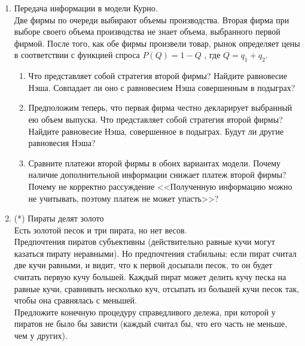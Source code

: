 \documentclass[pdftex,12pt,a4paper]{article}
\begin{document}
\begin{enumerate}
\item Передача информации в модели Курно.\\
Две фирмы по очереди выбирают объемы производства. Вторая фирма при выборе своего объема производства не знает объема, выбранного первой фирмой. После того, как обе фирмы произвели товар, рынок определяет цены в соответствии с функцией спроса $P\left( Q \right) = 1 - Q$
, где $Q = q_1  + q_2 $.
\begin{enumerate}
\item Что представляет собой стратегия второй фирмы? Найдите равновесие Нэша. Совпадает ли оно с равновесием Нэша совершенным в подыграх?
\item Предположим теперь, что первая фирма честно декларирует выбранный ею объем выпуска. Что представляет собой стратегия второй фирмы? Найдите равновесие Нэша, совершенное в подыграх. Будут ли другие равновесия Нэша?
\item Сравните платежи второй фирмы в обоих вариантах модели. Почему наличие дополнительной информации снижает платеж второй фирмы? Почему не корректно рассуждение <<Полученную информацию можно не учитывать, поэтому платеж не может упасть>>?
\end{enumerate}

\item (*) Пираты делят золото \\
Есть золотой песок и три пирата, но нет весов.\\
Предпочтения пиратов субъективны (действительно равные кучи могут казаться пирату неравными). Но предпочтения стабильны: если пират считал две кучи равными,  и видит, что к первой досыпали песок, то он будет считать первую кучу большей. Каждый пират может делить кучу песка на равные кучи, сравнивать несколько куч, отсыпать из большей кучи песок так, чтобы она сравнялась с меньшей.\\
Предложите конечную процедуру справедливого дележа, при которой у пиратов не было бы зависти (каждый считал бы, что его часть не меньше, чем у других).


\end{enumerate}
\end{document}
